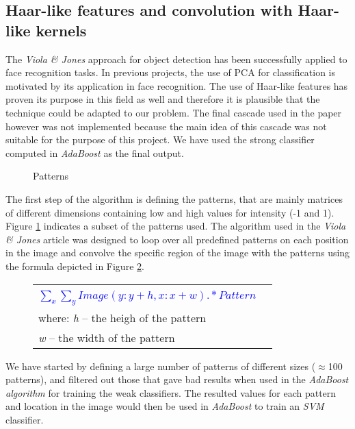 \documentclass[11pt,twocolumn]{article}
\begin{document}
		\subsection{Haar-like features and convolution with Haar-like kernels}\label{sec:Haar}
			The \emph{Viola \& Jones} approach for object detection has been successfully applied to face recognition tasks. In previous projects, the use of PCA for classification is motivated by its application in face recognition. The use of Haar-like features has proven its purpose in this field as well and therefore it is plausible that the technique could be adapted to our problem. The final cascade used in the paper however was not implemented because the main idea of this cascade was not suitable for the purpose of this project. We have used the strong classifier computed in \emph{AdaBoost} as the final output.

			\begin{figure}[!hbtp]
				\caption{Patterns}
				\label{patterns}
			\end{figure}

			The first step of the algorithm is defining the patterns, that are mainly matrices of different dimensions containing low and high values for intensity (-1 and 1). Figure \ref{patterns} indicates a subset of the patterns used. The algorithm used in the \emph{Viola \& Jones} article was designed to loop over all predefined patterns on each position in the image and convolve the specific region of the image with the patterns using the formula depicted in Figure \ref{patterns_formula}.
			
			\begin{figure}
				\selectfont\small
				\caption{}
				\begin{tabular}{|lr|} \hline
					& \\[5pt]
					\textcolor{blue}{$\sum_x\sum_y Image(y:y+h,x:x+w) .* Pattern$} &\\[10pt]
					where: \emph{h} -- the heigh of the pattern &\\
					\hspace*{28px} \emph{w} -- the width of the pattern &\\[5pt] 
					\hline 
				\end{tabular}
				\label{patterns_formula}
			\end{figure}
			
			We have started by defining a large number of patterns of different sizes ($\approx$100 patterns), and filtered out those that gave bad results when used in the \emph{AdaBoost algorithm} for training the weak classifiers. The resulted values for each pattern and location in the image would then be used in \emph{AdaBoost} to train an \emph{SVM} classifier. 
			
\end{document}
